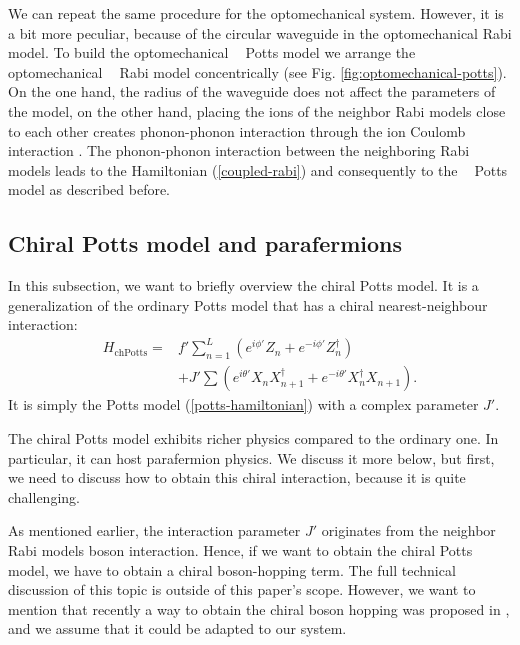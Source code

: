 \documentclass[reprint, aps, prx, amsmath, amssymb, longbibliography, superscriptaddress]{revtex4-2}
\DeclareMathOperator{\Zthree}{\mathbb{Z}_3}
\begin{document}
We can repeat the same procedure for the optomechanical system. However, it is a bit more peculiar, because of the circular waveguide in the optomechanical Rabi model. To build the optomechanical $\Zthree$ Potts model we arrange the optomechanical $\Zthree$ Rabi model concentrically (see Fig. \ref{fig:optomechanical-potts}). On the one hand, the radius of the waveguide does not affect the parameters of the model, on the other hand, placing the ions of the neighbor Rabi models close to each other creates phonon-phonon interaction through the ion Coulomb interaction \cite{schneider_experimental_2012,timm_dynamics_2023}. The phonon-phonon interaction between the neighboring Rabi models leads to the Hamiltonian (\ref{coupled-rabi}) and consequently to the $\Zthree$ Potts model as described before.


\subsection{Chiral Potts model and parafermions}


In this subsection, we want to briefly overview the chiral Potts model. It is a generalization of the ordinary Potts model that has a chiral nearest-neighbour interaction:
\begin{equation}
\label{chiral-potts-hamiltonian}
\begin{aligned}
    H_{\text{chPotts}} = &f'\sum_{n=1}^L (e^{i\phi'} Z_n + e^{-i\phi'} Z_n^{\dagger}) \\
    &+ J' \sum (e^{i\theta'} X_n X_{n+1}^{\dagger} + e^{-i\theta'} X_n^{\dagger} X_{n+1}).
\end{aligned}
\end{equation}
It is simply the Potts model (\ref{potts-hamiltonian}) with a complex parameter $J'$. 

The chiral Potts model exhibits richer physics compared to the ordinary one. In particular, it can host parafermion physics. We discuss it more below, but first, we need to discuss how to obtain this chiral interaction, because it is quite challenging.

As mentioned earlier, the interaction parameter $J'$ originates from the neighbor $\Zthree$ Rabi models boson interaction. Hence, if we want to obtain the chiral Potts model, we have to obtain a chiral boson-hopping term. The full technical discussion of this topic is outside of this paper's scope. However, we want to mention that recently a way to obtain the chiral boson hopping was proposed in \cite{bermudez_synthetic_2011}, and we assume that it could be adapted to our system.
\end{document}
